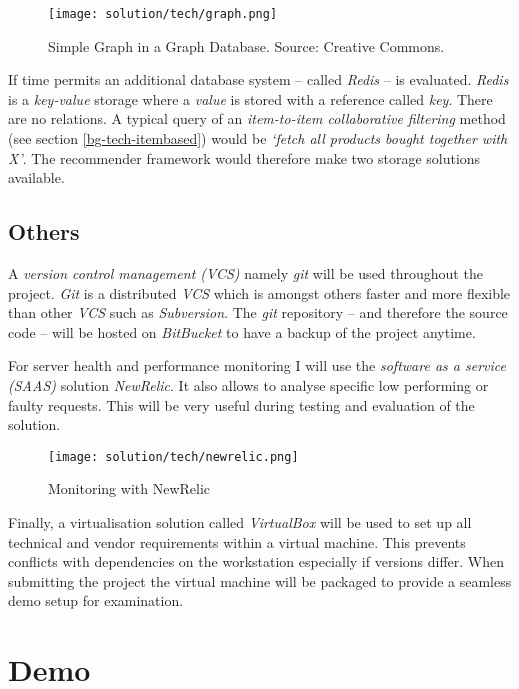 \begin{figure}[ht]
    \texttt{[image: solution/tech/graph.png]}
    \caption[Simple Graph in a Graph Database]{Simple Graph in a Graph Database. Source: Creative Commons.}
    \label{fig:graph}
\end{figure}

If time permits an additional database system -- called \emph{Redis} -- is evaluated. \emph{Redis} is a \emph{key-value} storage where a \emph{value} is stored with a reference called \emph{key}. There are no relations. A typical query of an \emph{item-to-item collaborative filtering} method (see section \ref{bg-tech-itembased}) would be \emph{`fetch all products bought together with X'}. The recommender framework would therefore make two storage solutions available.

\subsection{Others}

A \emph{version control management (VCS)} namely \emph{git} will be used throughout the project. \emph{Git} is a distributed \emph{VCS} which is amongst others faster and more flexible than other \emph{VCS} such as \emph{Subversion}. The \emph{git} repository -- and therefore the source code -- will be hosted on \emph{BitBucket} to have a backup of the project anytime.

For server health and performance monitoring I will use the \emph{software as a service (SAAS)} solution \emph{NewRelic}. It also allows to analyse specific low performing or faulty requests. This will be very useful during testing and evaluation of the solution.

\begin{figure}[ht]
    \texttt{[image: solution/tech/newrelic.png]}
    \caption{Monitoring with NewRelic}
    \label{fig:newrelic}
\end{figure}

Finally, a virtualisation solution called \emph{VirtualBox} will be used to set up all technical and vendor requirements within a virtual machine. This prevents conflicts with dependencies on the workstation especially if versions differ. When submitting the project the virtual machine will be packaged to provide a seamless demo setup for examination.



\section{Demo}

